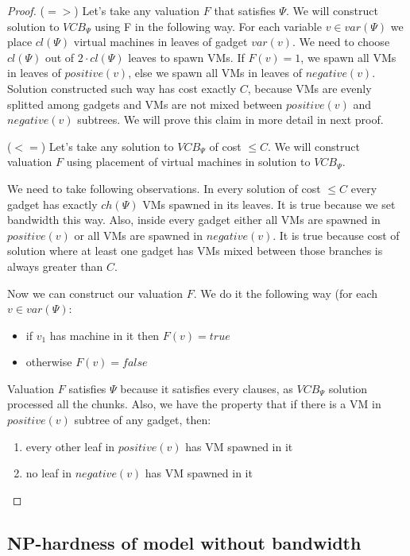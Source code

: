 \begin{proof}
($=>$) Let's take any valuation $F$ that satisfies $\Psi$. We will construct
solution to $VCB_{\Psi}$ using F in the following way. For each
variable $v \in var(\Psi)$ we place $cl(\Psi)$ virtual machines in
leaves of gadget $var(v)$. We need to choose $cl(\Psi)$ out of
$2 \cdot cl(\Psi)$ leaves to spawn VMs. If $F(v) = 1$, we spawn all VMs in leaves
of $positive(v)$, else we spawn all VMs in leaves of
$negative(v)$. Solution constructed such way has cost exactly
$C$, because VMs are evenly splitted among gadgets and VMs are not
mixed between $positive(v)$ and $negative(v)$ subtrees. We will prove
this claim in more detail in next proof. 

($<=$) Let's take any solution to $VCB_{\Psi}$ of cost $\leq C$. We
will construct valuation $F$ using placement of virtual machines in
solution to $VCB_{\Psi}$.

We need to take following observations. In every solution of cost
$\leq C$ every gadget has exactly $ch(\Psi)$ VMs spawned in its
leaves. It is true because we set bandwidth this way. Also, inside every gadget either all VMs are spawned in
$positive(v)$ or all VMs are spawned in $negative(v)$. It is true
because cost of solution where at least one gadget has VMs mixed
between those branches is always greater than $C$.

Now we can construct our valuation $F$. We do it the following way
(for each $v \in var(\Psi)$:

\begin{itemize}
\item if $v_1$ has machine in it then $F(v) = true$
\item otherwise $F(v) = false$
\end{itemize}

Valuation $F$ satisfies $\Psi$ because it satisfies every clauses, as
$VCB_{\Psi}$ solution processed all the chunks. Also, we have the
property that if there is a VM in $positive(v)$ subtree of any gadget,
then:
\begin{enumerate}
\item every other leaf in $positive(v)$ has VM spawned in it
\item no leaf in $negative(v)$ has VM spawned in it
\end{enumerate}

\end{proof}

\subsection{NP-hardness of model without bandwidth}

